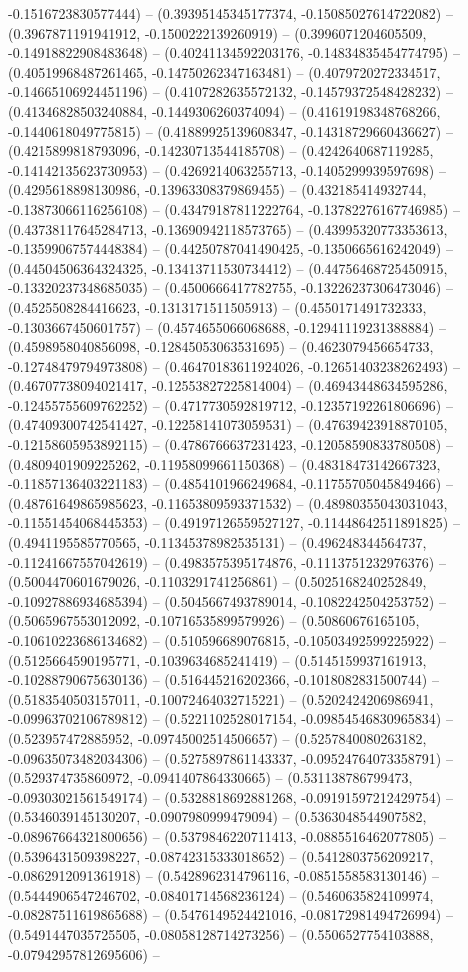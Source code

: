 -0.1516723830577444) -- (0.39395145345177374, -0.15085027614722082) -- (0.3967871191941912, -0.1500222139260919) -- (0.3996071204605509, -0.14918822908483648) -- (0.40241134592203176, -0.14834835454774795) -- (0.40519968487261465, -0.14750262347163481) -- (0.4079720272334517, -0.14665106924451196) -- (0.4107282635572132, -0.14579372548428232) -- (0.41346828503240884, -0.1449306260374094) -- (0.41619198348768266, -0.1440618049775815) -- (0.41889925139608347, -0.14318729660436627) -- (0.4215899818793096, -0.14230713544185708) -- (0.4242640687119285, -0.14142135623730953) -- (0.4269214063255713, -0.1405299939597698) -- (0.4295618898130986, -0.13963308379869455) -- (0.432185414932744, -0.13873066116256108) -- (0.43479187811222764, -0.13782276167746985) -- (0.43738117645284713, -0.13690942118573765) -- (0.43995320773353613, -0.13599067574448384) -- (0.44250787041490425, -0.1350665616242049) -- (0.44504506364324325, -0.13413711530734412) -- (0.44756468725450915, -0.13320237348685035) -- (0.4500666417782755, -0.13226237306473046) -- (0.4525508284416623, -0.1313171511505913) -- (0.4550171491732333, -0.1303667450601757) -- (0.4574655066068688, -0.12941119231388884) -- (0.4598958040856098, -0.12845053063531695) -- (0.4623079456654733, -0.12748479794973808) -- (0.46470183611924026, -0.12651403238262493) -- (0.46707738094021417, -0.12553827225814004) -- (0.46943448634595286, -0.12455755609762252) -- (0.4717730592819712, -0.12357192261806696) -- (0.47409300742541427, -0.12258141073059531) -- (0.47639423918870105, -0.12158605953892115) -- (0.4786766637231423, -0.12058590833780508) -- (0.4809401909225262, -0.11958099661150368) -- (0.48318473142667323, -0.11857136403221183) -- (0.4854101966249684, -0.11755705045849466) -- (0.48761649865985623, -0.11653809593371532) -- (0.48980355043031043, -0.11551454068445353) -- (0.49197126559527127, -0.11448642511891825) -- (0.4941195585770565, -0.11345378982535131) -- (0.496248344564737, -0.11241667557042619) -- (0.4983575395174876, -0.1113751232976376) -- (0.5004470601679026, -0.1103291741256861) -- (0.5025168240252849, -0.10927886934685394) -- (0.5045667493789014, -0.1082242504253752) -- (0.5065967553012092, -0.10716535899579926) -- (0.50860676165105, -0.10610223686134682) -- (0.510596689076815, -0.10503492599225922) -- (0.5125664590195771, -0.1039634685241419) -- (0.5145159937161913, -0.10288790675630136) -- (0.516445216202366, -0.1018082831500744) -- (0.5183540503157011, -0.10072464032715221) -- (0.5202424206986941, -0.09963702106789812) -- (0.5221102528017154, -0.09854546830965834) -- (0.523957472885952, -0.09745002514506657) -- (0.5257840080263182, -0.09635073482034306) -- (0.5275897861143337, -0.09524764073358791) -- (0.529374735860972, -0.0941407864330665) -- (0.531138786799473, -0.09303021561549174) -- (0.5328818692881268, -0.09191597212429754) -- (0.5346039145130207, -0.0907980999479094) -- (0.5363048544907582, -0.08967664321800656) -- (0.5379846220711413, -0.0885516462077805) -- (0.5396431509398227, -0.08742315333018652) -- (0.5412803756209217, -0.0862912091361918) -- (0.5428962314796116, -0.0851558583130146) -- (0.5444906547246702, -0.08401714568236124) -- (0.5460635824109974, -0.08287511619865688) -- (0.5476149524421016, -0.08172981494726994) -- (0.5491447035725505, -0.08058128714273256) -- (0.5506527754103888, -0.07942957812695606) -- 